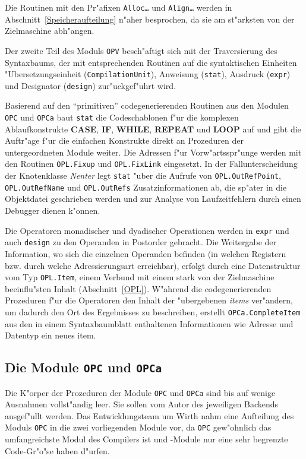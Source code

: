 Die Routinen mit den Pr"afixen {\tt Alloc\ldots} und {\tt Align\ldots} werden
in Abschnitt~\ref{Speicheraufteilung} n"aher besprochen, da sie am st"arksten
von der Zielmaschine abh"angen.

\medskip
Der zweite Teil des Moduls {\tt OPV} besch"aftigt sich mit der Traversierung
des Syntaxbaums, der mit entsprechenden Routinen auf die syntaktischen Einheiten
"Ubersetzungseinheit ({\tt CompilationUnit}), Anweisung ({\tt stat}),
Ausdruck ({\tt expr}) und Designator ({\tt design}) zur"uckgef"uhrt wird.

Basierend auf den "`primitiven"' codegenerierenden Routinen aus den Modulen {\tt OPC}
und {\tt OPCa} baut {\tt stat} die Codeschablonen f"ur die komplexen
Ablaufkonstrukte {\bf CASE}, {\bf IF}, {\bf WHILE}, {\bf REPEAT} und {\bf LOOP}
auf und gibt die Auftr"age f"ur die einfachen Konstrukte direkt an
Prozeduren der untergeordneten Module weiter.
Die Adressen f"ur Vorw"artsspr"unge werden mit den Routinen {\tt OPL.Fixup} und
{\tt OPL.FixLink} eingesetzt.
In der Fallunterscheidung der Knotenklasse {\it Nenter\/} legt {\tt stat} "uber
die Aufrufe von {\tt OPL.OutRefPoint}, {\tt OPL.OutRefName} und {\tt OPL.OutRefs}
Zusatzinformationen ab, die sp"ater in die Objektdatei geschrieben werden und
zur Analyse von Laufzeitfehlern durch einen Debugger dienen k"onnen.

\medskip
Die Operatoren monadischer und dyadischer Operationen werden in {\tt expr} und
auch {\tt design} zu den Operanden in Postorder gebracht.
Die Weitergabe der Information, wo sich die einzelnen Operanden befinden
(in welchen Registern bzw. durch welche Adressierungsart erreichbar), erfolgt
durch eine Datenstruktur vom Typ {\tt OPL.Item}, einem Verbund mit einem
stark von der Zielmaschine beeinflu"sten Inhalt (Abschnitt~\ref{OPL}).
W"ahrend die codegenerierenden Prozeduren f"ur die Operatoren den Inhalt der
"ubergebenen {\it items\/} ver"andern, um dadurch den Ort des Ergebnisses
zu beschreiben, erstellt {\tt OPCa.CompleteItem} aus den in einem Syntaxbaumblatt
enthaltenen Informationen wie Adresse und Datentyp ein neues item.

\subsection{Die Module {\tt OPC} und {\tt OPCa}}
\label{OPC} \label{OPCa}

Die K"orper der Prozeduren der Module {\tt OPC} und {\tt OPCa} sind
bis auf wenige Ausnahmen vollst"andig leer.
Sie sollen vom Autor des jeweiligen Backends ausgef"ullt werden.
Das Entwicklungsteam um Wirth nahm eine Aufteilung des Moduls {\tt OPC}
in die zwei vorliegenden Module vor, da {\tt OPC} gew"ohnlich das
umfangreichste Modul des Compilers ist und \oberon-Module nur eine
sehr begrenzte Code-Gr"o"se haben d"urfen.

